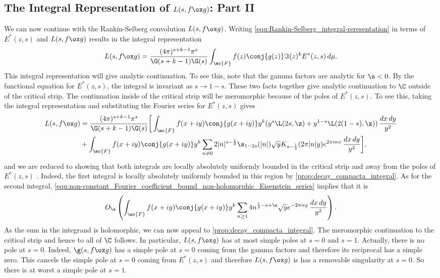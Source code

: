    \subsection*{The Integral Representation of \texorpdfstring{$L(s,f \ox g)$}{L(s,f \ox g)}: Part II}
      We can now continue with the Rankin-Selberg convolution $L(s,f \ox g)$. Writing \cref{equ:Rankin-Selberg_integral-reresentation} in terms of $E^{\ast}(z,s)$ and $L(s,f \ox g)$ results in the integral representation
      \[
        L(s,f \ox g) = \frac{(4\pi)^{s+k-1}\pi^{s}}{\G(s+k-1)\G(s)}\int_{\mc{F}}f(z)\conj{g(z)}\Im(z)^{k}E^{\ast}(z,s)\,d\mu.
      \]
      This integral representation will give analytic continuation. To see this, note that the gamma factors are analytic for $\s < 0$. By the functional equation for $E^{\ast}(z,s)$, the integral is invariant as $s \to 1-s$. These two facts together give analytic continuation to $\C$ outside of the critical strip. The continuation inside of the critical strip will be meromorphic because of the poles of $E^{\ast}(z,s)$. To see this, taking the integral representation and substituting the Fourier series for $E^{\ast}(z,s)$ gives
      \begin{equation}\label{equ:integral_representation_Rankin_Selberg}
        \begin{aligned}
          L(s,f \ox g) &= \frac{(4\pi)^{s+k-1}\pi^{s}}{\G(s+k-1)\G(s)}\bigg[\int_{\mc{F}}f(x+iy)\conj{g(x+iy)}y^{k}(y^{s}\L(2s,\z)+y^{1-s}\L(2(1-s),\z))\,\frac{dx\,dy}{y^{2}} \\
          &+\int_{\mc{F}}f(x+iy)\conj{g(x+iy)}y^{k}\sum_{n \neq 0}2|n|^{s-\frac{1}{2}}\s_{1-2s}(|n|)\sqrt{y}K_{s-\frac{1}{2}}(2\pi|n|y)e^{2\pi inx}\,\frac{dx\,dy}{y^{2}}\bigg],
        \end{aligned}
      \end{equation}
      and we are reduced to showing that both integrals are locally absolutely uniformly bounded in the critical strip and away from the poles of $E^{\ast}(z,s)$ . Indeed, the first integral is locally absolutely uniformly bounded in this region by \cref{prop:decay_compacta_integral}. As for the second integral, \cref{equ:non-constant_Fourier_coefficient_bound_non-holomorphic_Eisenstein_series} implies that it is
      \[
        O_{\e}\left(\int_{\mc{F}}f(x+iy)\conj{g(x+iy)}y^{k}\sum_{n \ge 1}4n^{\frac{1}{2}-s+\e}\sqrt{y}e^{-2\pi ny}\,\frac{dx\,dy}{y^{2}}\right).
      \]
      As the sum in the integrand is holomorphic, we can now appeal to \cref{prop:decay_compacta_integral}. The meromorphic continuation to the critical strip and hence to all of $\C$ follows. In particular, $L(s,f \ox g)$ has at most simple poles at $s = 0$ and $s = 1$. Actually, there is no pole at $s = 0$. Indeed, $\g(s,f \ox g)$ has a simple pole at $s = 0$ coming from the gamma factors and therefore its reciprocal has a simple zero. This cancels the simple pole at $s = 0$ coming from $E^{\ast}(z,s)$ and therefore $L(s,f \ox g)$ is has a removable singularity at $s = 0$. So there is at worst a simple pole at $s = 1$.
